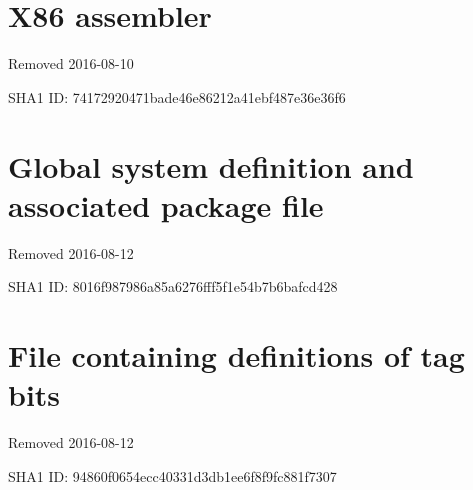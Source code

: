 \section{X86 assembler}

Removed 2016-08-10

SHA1 ID: 74172920471bade46e86212a41ebf487e36e36f6

\section{Global system definition and associated package file}

Removed 2016-08-12

SHA1 ID: 8016f987986a85a6276fff5f1e54b7b6bafcd428

\section{File containing definitions of tag bits}

Removed 2016-08-12

SHA1 ID: 94860f0654ecc40331d3db1ee6f8f9fc881f7307
